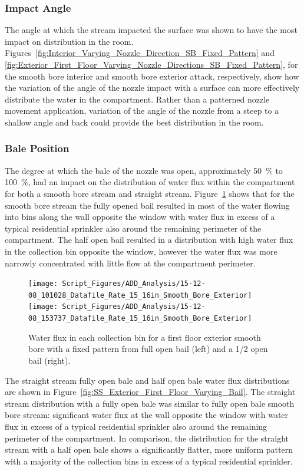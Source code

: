 \documentclass[12pt,oneside]{book}
\begin{document}
\subsubsection{Impact Angle}
The angle at which the stream impacted the surface was shown to have the most impact on distribution in the room. Figures~\ref{fig:Interior_Varying_Nozzle_Direction_SB_Fixed_Pattern} and \ref{fig:Exterior_First_Floor_Varying_Nozzle_Directions_SB_Fixed_Pattern}, for the smooth bore interior and smooth bore exterior attack, respectively, show how the variation of the angle of the nozzle impact with a surface can more effectively distribute the water in the compartment. Rather than a patterned nozzle movement application, variation of the angle of the nozzle from a steep to a shallow angle and back could provide the best distribution in the room.  

\subsubsection{Bale Position}
The degree at which the bale of the nozzle was open, approximately 50~\% to 100~\%, had an impact on the distribution of water flux within the compartment for both a smooth bore stream and straight stream. Figure~\ref{fig:SB_Exterior_First_Floor_Varying_Bail} shows that for the smooth bore stream the fully opened bail resulted in most of the water flowing into bins along the wall opposite the window with water flux in excess of a typical residential sprinkler also around the remaining perimeter of the compartment. The half open bail resulted in a distribution with high water flux in the collection bin opposite the window, however the water flux was more narrowly concentrated with little flow at the compartment perimeter. 

\begin{figure}[ht]
\texttt{[image: Script\_Figures/ADD\_Analysis/15-12-08\_101028\_Datafile\_Rate\_15\_16in\_Smooth\_Bore\_Exterior]}
\texttt{[image: Script\_Figures/ADD\_Analysis/15-12-08\_153737\_Datafile\_Rate\_15\_16in\_Smooth\_Bore\_Exterior]} \\ 
\caption[Water Flux Varying Bail Opening Smooth Bore]{Water flux in each collection bin for a first floor exterior smooth bore with a fixed pattern from full open bail (left) and a 1/2 open bail (right).}
\label{fig:SB_Exterior_First_Floor_Varying_Bail}
\end{figure}

The straight stream fully open bale and half open bale water flux distributions are shown in Figure~\ref{fig:SS_Exterior_First_Floor_Varying_Bail}. The straight stream distribution with a fully open bale was similar to fully open bale smooth bore stream: significant water flux at the wall opposite the window with water flux in excess of a typical residential sprinkler also around the remaining perimeter of the compartment. In comparison, the distribution for the straight stream with a half open bale shows a significantly flatter, more uniform pattern with a majority of the collection bins in excess of a typical residential sprinkler.
\end{document}
